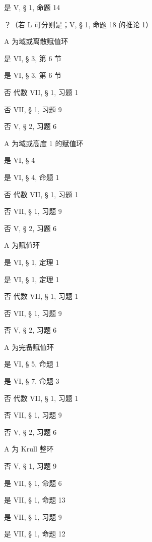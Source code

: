 是 V, § 1, 命题 14

？（若 L 可分则是；V, § 1, 命题 18 的推论 1）

A 为域或离散赋值环

是 VI, § 3, 第 6 节

是 VI, § 3, 第 6 节

否 代数 VII, § 1, 习题 1

否 VII, § 1, 习题 9

否 V, § 2, 习题 6

A 为域或高度 1 的赋值环

是 VI, § 4

是 VI, § 4, 命题 1

否 代数 VII, § 1, 习题 1

否 VII, § 1, 习题 9

否 V, § 2, 习题 6

A 为赋值环

是 VI, § 1, 定理 1

是 VI, § 1, 定理 1

否 代数 VII, § 1, 习题 1

否 VII, § 1, 习题 9

否 V, § 2, 习题 6

A 为完备赋值环

是 VI, § 5, 命题 1

是 VI, § 7, 命题 3

否 代数 VII, § 1, 习题 1

否 VII, § 1, 习题 9

否 V, § 2, 习题 6

A 为 Krull 整环

否 V, § 1, 习题 9

是 VII, § 1, 命题 6

是 VII, § 1, 命题 13

是 VII, § 1, 习题 9

是 VII, § 1, 命题 12

